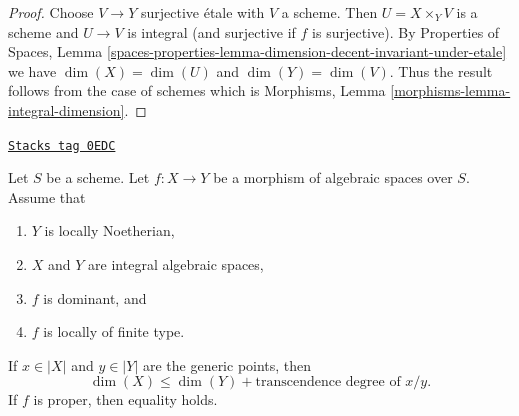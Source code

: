 \begin{proof}
Choose $V \to Y$ surjective \'etale with $V$ a scheme.
Then $U = X \times_Y V$ is a scheme and $U \to V$ is integral
(and surjective if $f$ is surjective).
By Properties of Spaces, Lemma
\ref{spaces-properties-lemma-dimension-decent-invariant-under-etale}
we have $\dim(X) = \dim(U)$ and $\dim(Y) = \dim(V)$.
Thus the result follows from the case of schemes
which is Morphisms, Lemma \ref{morphisms-lemma-integral-dimension}.
\end{proof}

\begin{lemma}
\label{spaces-over-fields-lemma-alteration-dimension}
\href{https://stacks.math.columbia.edu/tag/0EDC}{\texttt{Stacks tag 0EDC}}

Let $S$ be a scheme. Let $f : X \to Y$ be a morphism of algebraic spaces
over $S$. Assume that
\begin{enumerate}
\item $Y$ is locally Noetherian,
\item $X$ and $Y$ are integral algebraic spaces,
\item $f$ is dominant, and
\item $f$ is locally of finite type.
\end{enumerate}
If $x \in |X|$ and $y \in |Y|$ are the generic points, then
$$
\dim(X) \leq \dim(Y) + \text{transcendence degree of }x/y.
$$
If $f$ is proper, then equality holds.
\end{lemma}

